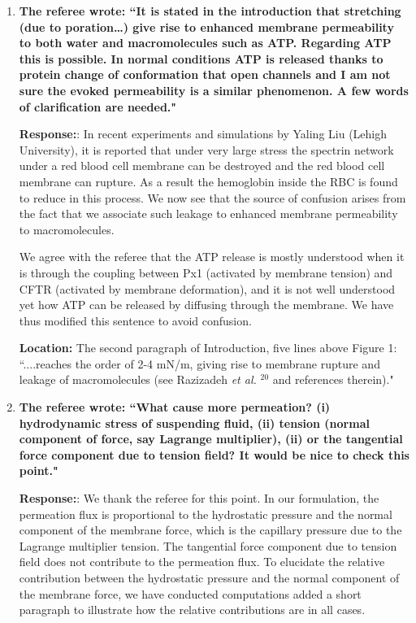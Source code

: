 \documentclass[11pt]{article}
\begin{document}
\begin{enumerate}
\item {\bf 
The referee wrote:
``It is stated in the introduction that stretching (due to poration…)
give rise to enhanced membrane permeability to both water and
macromolecules such as ATP. Regarding ATP this is possible. In normal
conditions ATP is released thanks to protein change of conformation
that open channels and I am not sure the evoked permeability is a
similar phenomenon. A few words of clarification are needed."}

\noindent
{\bf Response:}: In recent experiments and simulations by Yaling Liu (Lehigh University), it is reported that under very large stress the spectrin network under a red blood cell membrane can be destroyed and the red blood cell membrane can rupture. As a result the hemoglobin inside the RBC is found to reduce in this process. We now see that the source of confusion arises from the fact that we associate such leakage to enhanced membrane permeability to macromolecules. 

We agree with the referee that the ATP release is mostly understood when it is through the coupling between Px1 (activated by membrane tension) and CFTR (activated by membrane deformation), and it is not well understood yet how ATP can be released by diffusing through the membrane. We have thus modified this sentence to avoid confusion.

\noindent
{\bf Location:}  The second paragraph of Introduction, five lines above Figure 1: ``....reaches the order of 2-4 mN/m, giving rise to
membrane rupture and leakage of macromolecules (see Razizadeh {\it et al. }$^{20}$ and references therein)."

\item {\bf
The referee wrote:
``What cause more permeation? (i) hydrodynamic stress of suspending
fluid, (ii) tension (normal component of force, say Lagrange
multiplier), (ii) or the tangential force component due to tension
field? It would be nice to check this point."}

\noindent
{\bf Response:}: We thank the referee for this point. In our formulation, the permeation flux is proportional to the hydrostatic pressure and the normal component of the membrane force, which is the capillary pressure due to the Lagrange multiplier tension. The tangential force component due to tension field does not contribute to the permeation flux. To elucidate the relative contribution between the hydrostatic pressure and the normal component of the membrane force, we have conducted computations 
added a short paragraph to illustrate how the relative contributions are in all cases.


\end{enumerate}
\end{document}
